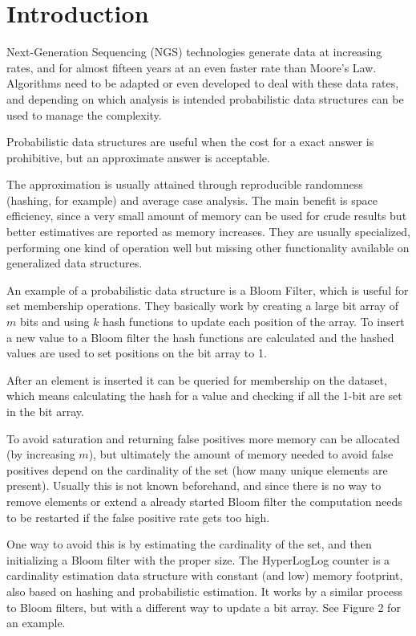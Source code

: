 \documentclass{bioinfo}
\begin{document}
\section{Introduction}

Next-Generation Sequencing (NGS) technologies generate data at increasing rates,
and for almost fifteen years at an even faster rate than Moore's Law.
Algorithms need to be adapted or even developed to deal with these data rates,
and depending on which analysis is intended probabilistic data structures
can be used to manage the complexity.

Probabilistic data structures are useful when the cost for a exact
answer is prohibitive,
but an approximate answer is acceptable.

The approximation is usually attained through reproducible randomness (hashing, for example)
and average case analysis.
The main benefit is space efficiency,
since a very small amount of memory can be used for crude results but
better estimatives are reported as memory increases.
They are usually specialized,
performing one kind of operation well but missing other functionality available
on generalized data structures.

An example of a probabilistic data structure is a Bloom Filter,
which is useful for set membership operations.
They basically work by creating a large bit array of $m$ bits and using
$k$ hash functions to update each position of the array.
To insert a new value to a Bloom filter the hash functions are calculated
and the hashed values are used to set positions on the bit array to 1.

After an element is inserted it can be queried for membership on the dataset,
which means calculating the hash for a value and checking
if all the 1-bit are set in the bit array.

To avoid saturation and returning false positives more memory can be allocated (by increasing $m$),
but ultimately the amount of memory needed to avoid false positives depend
on the cardinality of the set (how many unique elements are present).
Usually this is not known beforehand,
and since there is no way to remove elements or extend a already started
Bloom filter the computation needs to be restarted if the false positive rate gets too high.

One way to avoid this is by estimating the cardinality of the set,
and then initializing a Bloom filter with the proper size.
The HyperLogLog counter is a cardinality estimation data structure with constant (and low) memory footprint,
also based on hashing and probabilistic estimation.
It works by a similar process to Bloom filters,
but with a different way to update a bit array.
See Figure 2 for an example.
\end{document}
